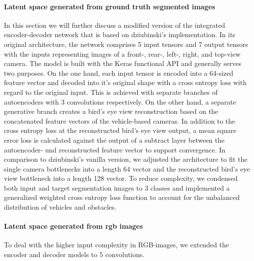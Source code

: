 \documentclass[letterpaper, 10 pt, conference]{ieeeconf}  %
\begin{document}
\paragraph{Latent space generated from ground truth segmented images}
In this section we will further discuss a modified version of the integrated encoder-decoder network that is based on 
dziubinski's \cite{dziubinskiSemanticSegmentationSemantic2019} implementation. In its original architecture, the network comprises 
5 input tensors and 7 output tensors with the inputs representing images of a front-, rear-, left-, right, and top-view camera. The 
model is built with the Keras functional API and generally serves two purposes. On the one hand, each input tensor is encoded into 
a 64-sized feature vector and decoded into it's original shape with a cross entropy loss with regard to the original input. This is 
achieved with separate branches of autoencoders with 3 convolutions respectively. On the other 
hand, a separate generative branch creates a bird's eye view reconstruction based on the concatenated feature vectors of the 
vehicle-based cameras. In addition to the cross entropy loss at the reconstructed bird's eye view output, a mean square error 
loss is calculated against the output of a subtract layer between the autoencoder- und reconstructed feature vector to support
convergence.
\newline In comparison to dziubinski's \cite{dziubinskiSemanticSegmentationSemantic2019} vanilla version, we 
adjusted the architecture to fit the single camera bottlenecks into a length 64 vector and the reconstructed bird's eye view
bottleneck into a length 128 vector. To reduce complexity, we condensed both input and target segmentation images to 3 classes 
and implemented a generalized weighted cross entropy\cite{zhangGeneralizedCrossEntropy2018} loss function to 
account for the unbalanced distribution of vehicles and obstacles.
\paragraph{Latent space generated from rgb images} To deal with the higher input complexity in RGB-images, we extended the
encoder and decoder models to 5 convolutions.
\end{document}

